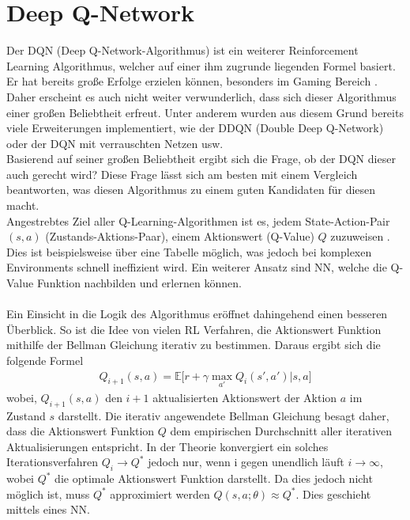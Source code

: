 \section{Deep Q-Network} \label{sec:Grundlagen_Deep_Q_Learning}
Der DQN (Deep Q-Network-Algorithmus) ist ein weiterer Reinforcement Learning Algorithmus, welcher auf einer ihm zugrunde liegenden Formel basiert. Er hat bereits große Erfolge erzielen können, besonders im Gaming Bereich \citep{DBLP:journals/corr/MnihKSGAWR13}. Daher erscheint es auch nicht weiter verwunderlich, dass sich dieser Algorithmus einer großen Beliebtheit erfreut. Unter anderem wurden aus diesem Grund bereits viele Erweiterungen implementiert, wie der DDQN (Double Deep Q-Network) oder der DQN mit verrauschten Netzen usw.\\
Basierend auf seiner großen Beliebtheit ergibt sich die Frage, ob der DQN dieser auch gerecht wird? Diese Frage lässt sich am besten mit einem Vergleich beantworten, was diesen Algorithmus zu einem guten Kandidaten für diesen macht.\\ 
Angestrebtes Ziel aller Q-Learning-Algorithmen ist es, jedem State-Action-Pair $(s,a)$ (Zustands-Aktions-Paar), einem Aktionswert (Q-Value) $Q$ zuzuweisen \citep[S. 126]{DRL_Lapan}. 
Dies ist beispielsweise über eine Tabelle möglich, was jedoch bei komplexen Environments schnell ineffizient wird. Ein weiterer Ansatz sind NN, welche die Q-Value Funktion nachbilden und erlernen können.\\
\\Ein Einsicht in die Logik des Algorithmus eröffnet dahingehend einen besseren Überblick. 
So ist die Idee von vielen RL Verfahren, die Aktionswert Funktion mithilfe der Bellman Gleichung iterativ zu bestimmen. Daraus ergibt sich die folgende Formel \citep{DBLP:journals/corr/MnihKSGAWR13}
\begin{align}
	Q_{i+1}(s,a) = \mathbb{E} \bigl\lbrack r + \gamma \max_{a'} Q_i(s',a')|s,a \bigr\rbrack
	\label{eq:Grundlagen_Bellman_Gleichung_iterativ}
\end{align}
wobei, $Q_{i+1}(s,a)$ den $i+1$ aktualisierten Aktionswert der Aktion $a$ im Zustand $s$ darstellt.
Die iterativ angewendete Bellman Gleichung  besagt daher, dass die Aktionswert Funktion $Q$ dem empirischen Durchschnitt aller iterativen Aktualisierungen entspricht.
In der Theorie konvergiert ein solches Iterationsverfahren $Q_i \longrightarrow Q^*$ jedoch nur, wenn i gegen unendlich läuft $i \longrightarrow \infty$, wobei $Q^*$ die optimale Aktionswert Funktion darstellt. Da dies jedoch nicht möglich ist, muss $Q^*$ approximiert werden $Q(s,a;\theta) \approx Q^*$. Dies geschieht mittels eines NN.
